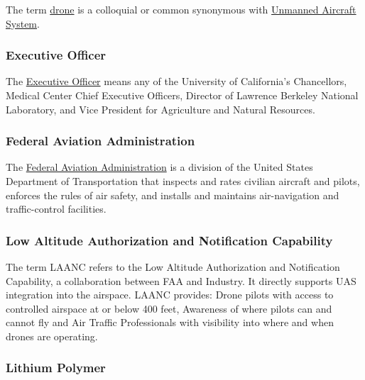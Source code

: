 \documentclass[
]{book}
\begin{document}
The term \protect\hyperlink{drone}{drone} is a colloquial or common synonymous with \protect\hyperlink{UAS}{Unmanned Aircraft System}.



\hypertarget{EO}{%
\subsubsection*{Executive Officer}\label{EO}}

The \protect\hyperlink{EO}{Executive Officer} means any of the University of California's Chancellors, Medical Center Chief Executive Officers, Director of Lawrence Berkeley National Laboratory, and Vice President for Agriculture and Natural Resources.



\hypertarget{FAA}{%
\subsubsection*{Federal Aviation Administration}\label{FAA}}

The \protect\hyperlink{FAA}{Federal Aviation Administration} is a division of the United States Department of Transportation that inspects and rates civilian aircraft and pilots, enforces the rules of air safety, and installs and maintains air-navigation and traffic-control facilities.





\hypertarget{LAANC}{%
\subsubsection*{Low Altitude Authorization and Notification Capability}\label{LAANC}}

The term LAANC refers to the Low Altitude Authorization and Notification Capability, a collaboration between FAA and Industry. It directly supports UAS integration into the airspace. LAANC provides: Drone pilots with access to controlled airspace at or below 400 feet, Awareness of where pilots can and cannot fly and Air Traffic Professionals with visibility into where and when drones are operating.



\hypertarget{LiPo}{%
\subsubsection*{Lithium Polymer}\label{LiPo}}
\end{document}
